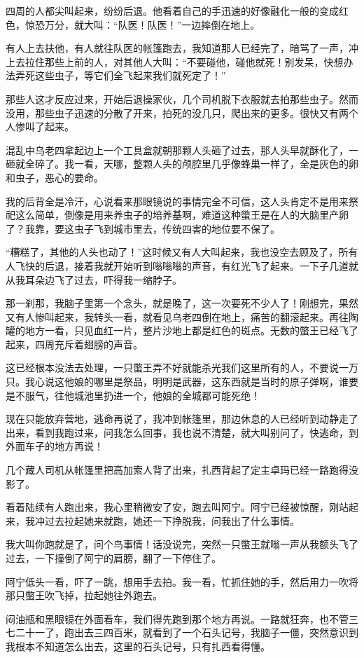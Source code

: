 四周的人都尖叫起来，纷纷后退。他看着自己的手迅速的好像融化一般的变成红色，惊恐万分，就大叫：“队医！队医！”一边摔倒在地上。

有人上去扶他，有人就往队医的帐篷跑去，我知道那人已经完了，暗骂了一声，冲上去拉住那些上前的人，对其他人大叫：“不要碰他，碰他就死！别发呆，快想办法弄死这些虫子，等它们全飞起来我们就死定了！”

那些人这才反应过来，开始后退操家伙，几个司机脱下衣服就去拍那些虫子。然而没用，那些虫子迅速的分散了开来，拍死的没几只，爬出来的更多。很快又有两个人惨叫了起来。

混乱中乌老四拿起边上一个工具盒就朝那颗人头砸了过去，那人头早就酥化了，一砸就全碎了。我一看，天哪，整颗人头的颅腔里几乎像蜂巢一样了，全是灰色的卵和虫子，恶心的要命。

我的后背全是冷汗，心说看来那眼镜说的事情完全不可信，这人头肯定不是用来祭祀这么简单，倒像是用来养虫子的培养基啊，难道这种蟞王是在人的大脑里产卵了？我靠，要这虫子飞到城市里去，传统四害的地位要不保了。

“糟糕了，其他的人头也动了！”这时候又有人大叫起来，我也没空去顾及了，所有人飞快的后退，接着我就开始听到嗡嗡嗡的声音，有红光飞了起来。一下子几道就从我耳朵边飞了过去，吓得我一缩脖子。

那一刹那，我脑子里第一个念头，就是晚了，这一次要死不少人了！刚想完，果然又有人惨叫起来，我转头一看，就看见乌老四倒在地上，痛苦的翻滚起来。再往陶罐的地方一看，只见血红一片，整片沙地上都是红色的斑点。无数的蟞王已经飞了起来，四周充斥着翅膀的声音。

这已经根本没法去处理，一只蟞王弄不好就能杀光我们这里所有的人，不要说一万只。我心说这他娘的哪里是祭品，明明是武器，这东西就是当时的原子弹啊，谁要是不服气，往他城池里扔进一个，他娘的全城都可能死绝！

现在只能放弃营地，逃命再说了，我冲到帐篷里，那边休息的人已经听到动静走了出来，看到我跑过来，问我怎么回事，我也说不清楚，就大叫别问了，快逃命，到外面车子的地方再说！

几个藏人司机从帐篷里把高加索人背了出来，扎西背起了定主卓玛已经一路跑得没影了。

看着陆续有人跑出来，我心里稍微安了安，跑去叫阿宁。阿宁已经被惊醒，刚站起来，我冲过去拉起她来就跑，她还一下挣脱我，问我出了什么事情。

我大叫你跑就是了，问个鸟事情！话没说完，突然一只蟞王就嗡一声从我额头飞了过去，一下撞倒了阿宁的肩膀，翻了一下停住了。

阿宁低头一看，吓了一跳，想用手去拍。我一看，忙抓住她的手，然后用力一吹将那只蟞王吹飞掉，拉起她往外跑去。

闷油瓶和黑眼镜在外面看车，我们得先跑到那个地方再说。一路就狂奔，也不管三七二十一了，跑出去三四百米，就看到了一个石头记号，我脑子一僵，突然意识到我根本不知道怎么出去，这里的石头记号，只有扎西看得懂。

